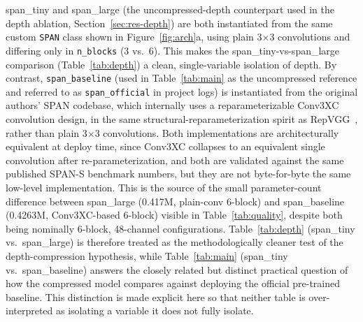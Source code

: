 \documentclass[pdflatex,sn-vancouver-num]{sn-jnl}
\begin{document}
span\_tiny and span\_large (the uncompressed-depth counterpart used in the depth ablation, Section~\ref{sec:res-depth}) are both instantiated from the same custom \texttt{SPAN} class shown in Figure~\ref{fig:arch}a, using plain 3$\times$3 convolutions and differing only in \texttt{n\_blocks} (3 vs.\ 6). This makes the span\_tiny-vs-span\_large comparison (Table~\ref{tab:depth}) a clean, single-variable isolation of depth. By contrast, \texttt{span\_baseline} (used in Table~\ref{tab:main} as the uncompressed reference and referred to as \texttt{span\_official} in project logs) is instantiated from the original authors' SPAN codebase, which internally uses a reparameterizable Conv3XC convolution design, in the same structural-reparameterization spirit as RepVGG~\cite{ding2021repvgg}, rather than plain 3$\times$3 convolutions. Both implementations are architecturally equivalent at deploy time, since Conv3XC collapses to an equivalent single convolution after re-parameterization, and both are validated against the same published SPAN-S benchmark numbers, but they are not byte-for-byte the same low-level implementation. This is the source of the small parameter-count difference between span\_large (0.417M, plain-conv 6-block) and span\_baseline (0.4263M, Conv3XC-based 6-block) visible in Table~\ref{tab:quality}, despite both being nominally 6-block, 48-channel configurations. Table~\ref{tab:depth} (span\_tiny vs.\ span\_large) is therefore treated as the methodologically cleaner test of the depth-compression hypothesis, while Table~\ref{tab:main} (span\_tiny vs.\ span\_baseline) answers the closely related but distinct practical question of how the compressed model compares against deploying the official pre-trained baseline. This distinction is made explicit here so that neither table is over-interpreted as isolating a variable it does not fully isolate.
\end{document}
